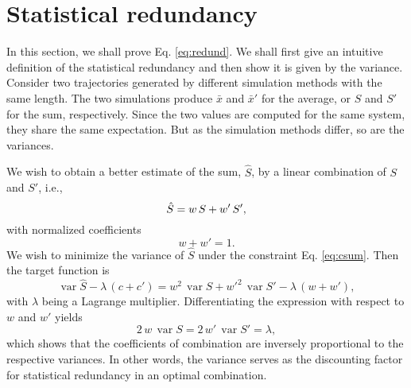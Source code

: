 \documentclass[12pt]{article}
\begin{document}
\section{\label{sec:redund}
Statistical redundancy}


In this section,
we shall prove Eq. \eqref{eq:redund}.
%
We shall first give an intuitive definition
of the statistical redundancy
and then show it is given by the variance.
%
Consider two trajectories generated by
different simulation methods with the same length.
%
The two simulations produce
$\bar x$ and $\bar x'$ for the average,
or
$S$ and $S'$ for the sum, respectively.
%
Since the two values are computed for the same system,
they share the same expectation.
%
But as the simulation methods differ, so are the variances.

We wish to obtain a better estimate of the sum, $\hat S$,
by a linear combination of $S$ and $S'$, i.e.,
\begin{equation}
  \hat S
  =
  w \, S + w' \, S',
  \notag
\end{equation}
%
with normalized coefficients
%
\begin{equation}
  w + w' = 1.
  \label{eq:csum}
\end{equation}
%
We wish to minimize the variance of $\hat S$ under the constraint
Eq. \eqref{eq:csum}.  Then the target function is
$$
\operatorname{var} \hat S - \lambda \, (c + c')
=
w^2 \, \operatorname{var} S
+
w'^2 \, \operatorname{var} S'
-
\lambda \, (w + w'),
$$
with $\lambda$ being a Lagrange multiplier.
%
Differentiating the expression with respect to $w$ and $w'$ yields
$$
2 \, w \, \operatorname{var} S
=
2 \, w' \, \operatorname{var} S'
=
\lambda,
$$
which shows that the coefficients of combination
are inversely proportional to the respective variances.
%
In other words, the variance serves as the discounting factor
for statistical redundancy in an optimal combination.
\end{document}
